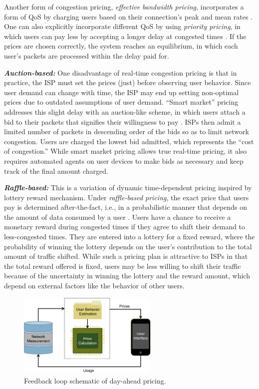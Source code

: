 Another form of congestion pricing, \emph{effective bandwidth pricing}, incorporates a form of QoS by charging users based on their connection's peak and mean rates \cite{Kelly-eff}. One can also explicitly incorporate different QoS by using \emph{priority pricing}, in which users can pay less by accepting a longer delay at congested times \cite{Gupta}. If the prices are chosen correctly, the system reaches an equilibrium, in which each user's packets are processed within the delay paid for.

\textbf{\emph{Auction-based:}} One disadvantage of real-time congestion pricing is that in practice, the ISP must set the prices (just) before observing user behavior. Since user demand can change with time, the ISP may end up setting non-optimal prices due to outdated assumptions of user demand. ``Smart market'' pricing addresses this slight delay with an auction-like scheme, in which users attach a bid to their packets that signifies their willingness to pay \cite{MacKie-Mason,Murphy-Murphy}. ISPs then admit a limited number of packets in descending order of the bids so as to limit network congestion. Users are charged the lowest bid admitted, which represents the ``cost of congestion.'' While smart market pricing allows true real-time pricing, it also requires automated agents on user devices to make bids as necessary and keep track of the final amount charged.

\textbf{\emph{Raffle-based:}} This is a variation of dynamic time-dependent pricing inspired by lottery reward mechanism. Under \emph{raffle-based pricing}, the exact price that users pay is determined after-the-fact, i.e., in a probabilistic manner that depends on the amount of data consumed by a user \cite{loiseau2011incentive}. Users have a chance to receive a monetary reward during congested times if they agree to shift their demand to less-congested times. They are entered into a lottery for a fixed reward, where the probability of winning the lottery depends on the user's contribution to the total amount of traffic shifted. While such a pricing plan is attractive to ISPs in that the total reward offered is fixed, users may be less willing to shift their traffic because of the uncertainty in winning the lottery and the reward amount, which depend on external factors like the behavior of other users.

\begin{figure}
\centering
\includegraphics[width = 0.6\textwidth]{Figures/Loop_TUBE.pdf}
\vspace{-0.1in}
\caption{Feedback loop schematic of day-ahead pricing.}
\label{fig:tube-loop}
\end{figure}

